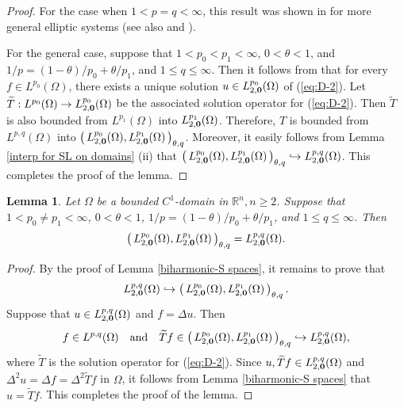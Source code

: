 \documentclass[reqno,centertags,11pt]{amsart}
\newtheorem{lem}[thm]{Lemma}
\theoremstyle{definition}
\numberwithin{thm}{section}
\numberwithin{equation}{section}
\newcommand{\R}{{\mathbb{R}}}
\begin{document}
\begin{proof}  For the case when  $1<p=q<\infty$, this result was   shown  in \cite[Theorem 8.6]{DK2} for more general elliptic systems (see also \cite[Theorem 2.1]{AP98} and \cite[Theorem 1.6]{MM_book}).

For the general case, suppose that   $1<p_0 <  p_1 <\infty$, $0< \theta < 1$, and $1/p=(1-\theta)/p_0 +\theta/p_1$,
and $1 \le q \le \infty$.
Then it follows from  \cite[Theorem 8.6]{DK2}  that for every $f \in L^{p_0} (\Omega )$, there exists a unique solution $u \in L_{2,{\bf 0}}^{p_0} (\Omega )$ of  (\ref{eq:D-2}). Let   $\widetilde{T} : L^{p_0} (\Omega ) \to L_{2,{\bf 0}}^{p_0} (\Omega )$ be the associated  solution operator for (\ref{eq:D-2}).  Then  $\widetilde{T}$ is  also bounded from  $L^{p_1} (\Omega )$ into $ L_{2,{\bf 0}}^{p_1} (\Omega )$.
Therefore,   $T$ is bounded from $   L^{p,q}(\Omega ) $ into $\left(\,  L_{2,{\bf 0}}^{p_0}(\Omega ) , L_{2,{\bf 0}}^{p_1}(\Omega ) \, \right)_{\theta,q}$.
Moreover, it easily follows from Lemma \ref{interp for SL on domains} (ii) that $\left(\,  L_{2,{\bf 0}}^{p_0}(\Omega ) , L_{2,{\bf 0}}^{p_1}(\Omega ) \, \right)_{\theta,q} \hookrightarrow L_{2,{\bf 0}}^{p,q}(\Omega )$.
This completes the proof of the lemma.
\end{proof}




\begin{lem}\label{lem:interpolation_L00}
 Let $\Omega$ be a bounded $C^{1}$-domain in $\R^n , n \ge 2 $. Suppose  that $1<p_0 \neq  p_1 <\infty$, $0< \theta < 1$, $1/p=(1-\theta)/p_0 +\theta/p_1$,  and $1 \le q \le \infty$.
Then
\[
\left(\,  L_{2,{\bf 0}}^{p_0}(\Omega ) , L_{2,{\bf 0}}^{p_1}(\Omega ) \, \right)_{\theta,q} = L_{2,{\bf 0} }^{p,q}(\Omega ) .
\]
\end{lem}

\begin{proof}
By the proof of Lemma \ref{biharmonic-S spaces}, it remains to prove that
$$
L_{2,{\bf 0}}^{p,q}(\Omega ) \hookrightarrow \left(\,  L_{2,{\bf 0}}^{p_0}(\Omega ) , L_{2,{\bf 0}}^{p_1}(\Omega ) \, \right)_{\theta,q}.
$$
Suppose that  $u \in L_{2,{\bf 0}}^{p,q}(\Omega ) $ and $f= \Delta u$. Then $$
f \in  L^{p,q}(\Omega ) \quad\mbox{and}\quad \widetilde{T} f \in \left(\,  L_{2,{\bf 0}}^{p_0}(\Omega ) , L_{2,{\bf 0}}^{p_1}(\Omega ) \, \right)_{\theta,q} \hookrightarrow L_{2,{\bf 0}}^{p,q}(\Omega ) ,
$$
where  $\widetilde{T} $ is  the  solution operator for (\ref{eq:D-2}).
 Since $u, \widetilde{T} f \in L_{2,{\bf 0}}^{p,q}(\Omega )$ and
$\Delta^2 u =\Delta f  =\Delta^2  \widetilde{T} f$ in $\Omega$,
 it follows from Lemma \ref{biharmonic-S spaces} that
$u =\widetilde{T} f$. This completes the proof of the lemma.
\end{proof}
\end{document}
